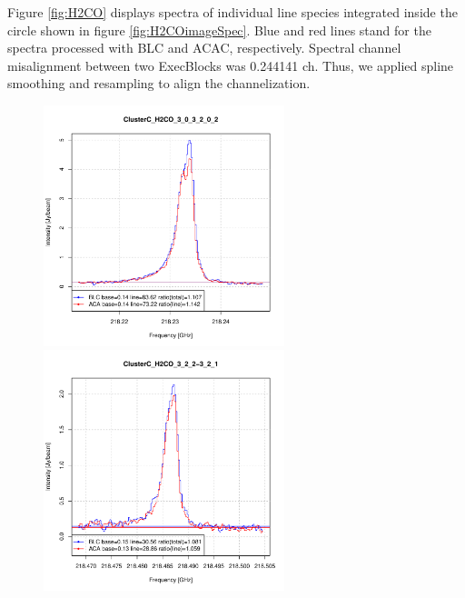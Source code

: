 \documentclass[a4paper, 10pt]{scrartcl}
\begin{document}
Figure \ref{fig:H2CO} displays spectra of individual line species integrated inside the circle shown in figure \ref{fig:H2COimageSpec}.
Blue and red lines stand for the spectra processed with BLC and ACAC, respectively.
Spectral channel misalignment between two ExecBlocks was 0.244141 ch. Thus, we applied spline smoothing and resampling to align the channelization.

\begin{figure}[h]
	\centering
	\includegraphics[width=7cm]{ClusterC_H2CO_3_0_3_2_0_2.pdf}\includegraphics[width=7cm]{ClusterC_H2CO_3_2_2-3_2_1.pdf}

\end{figure}
\end{document}
